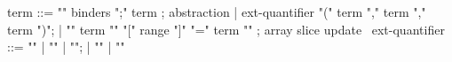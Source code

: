 \begin{syntax}
term ::= "\lambda" binders ";" term ; abstraction
| ext-quantifier "(" term "," term "," term ")";
| { "{" term "\with" "[" range "]" "=" term "}" }; array slice update
\
ext-quantifier ::= "\max" | "\min" | "\sum";
                      | "\product" | "\numof"
\end{syntax}
